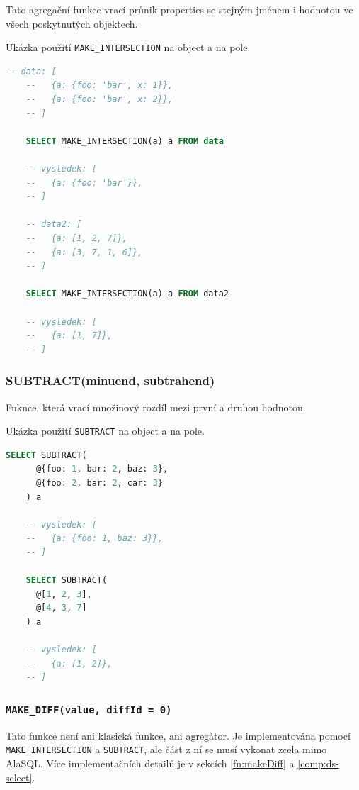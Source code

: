 Tato agregační funkce vrací průnik properties se stejným jménem i hodnotou ve všech poskytnutých objektech.

\begin{exmp}
  Ukázka použití \/\lstinline|MAKE_INTERSECTION| na object a na pole.

  \begin{lstlisting}[language=SQL]
    -- data: [
    --   {a: {foo: 'bar', x: 1}},
    --   {a: {foo: 'bar', x: 2}},
    -- ]

    SELECT MAKE_INTERSECTION(a) a FROM data

    -- vysledek: [
    --   {a: {foo: 'bar'}},
    -- ]

    -- data2: [
    --   {a: [1, 2, 7]},
    --   {a: [3, 7, 1, 6]},
    -- ]

    SELECT MAKE_INTERSECTION(a) a FROM data2

    -- vysledek: [
    --   {a: [1, 7]},
    -- ]
  \end{lstlisting}
\end{exmp}

\subsubsection*{SUBTRACT(minuend, subtrahend)}
\label{sql:subtract}

Fuknce, která vrací množinový rozdíl mezi první a druhou hodnotou.

\begin{exmp}
  Ukázka použití \/\lstinline|SUBTRACT| na object a na pole.

  \begin{lstlisting}[language=SQL]
    SELECT SUBTRACT(
      @{foo: 1, bar: 2, baz: 3},
      @{foo: 2, bar: 2, car: 3}
    ) a

    -- vysledek: [
    --   {a: {foo: 1, baz: 3}},
    -- ]

    SELECT SUBTRACT(
      @[1, 2, 3],
      @[4, 3, 7]
    ) a

    -- vysledek: [
    --   {a: [1, 2]},
    -- ]
  \end{lstlisting}
\end{exmp}

\subsubsection*{\protect\lstinline|MAKE_DIFF(value, diffId = 0)|}
\label{sql:make_diff}

Tato funkce není ani klasická funkce, ani agregátor. Je implementována pomocí \lstinline|MAKE_INTERSECTION| a \lstinline|SUBTRACT|, ale část z ní se musí vykonat zcela mimo AlaSQL. Více implementačních detailů je v sekcích \ref{fn:makeDiff} a \ref{comp:ds-select}.

